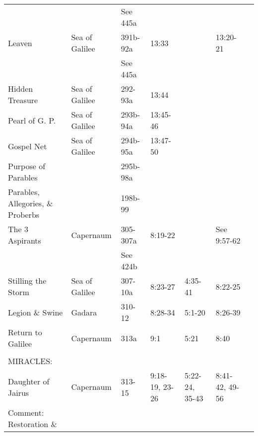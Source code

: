 \begin{longtable}[h]{lllllll}
                                   &                     & See 445a   &                 &                 &                      & \\
\quad Leaven                       & Sea of Galilee      & 391b-92a   & 13:33           &                 & 13:20-21             & \\
                                   &                     & See 445a   &                 &                 &                      & \\
\quad Hidden Treasure              & Sea of Galilee      & 292-93a    & 13:44           &                 &                      & \\
\quad Pearl of G. P.               & Sea of Galilee      & 293b-94a   & 13:45-46        &                 &                      & \\
\quad Gospel Net                   & Sea of Galilee      & 294b-95a   & 13:47-50        &                 &                      & \\
Purpose of Parables                &                     & 295b-98a   &                 &                 &                      & \\
Parables, Allegories, \& Proberbs  &                     & 198b-99    &                 &                 &                      & \\
The 3 Aspirants                    & Capernaum           & 305-307a   & 8:19-22         &                 & See 9:57-62          & \\
                                   &                     & See 424b   &                 &                 &                      & \\
Stilling the Storm                 & Sea of Galilee      & 307-10a    & 8:23-27         & 4:35-41         & 8:22-25              & \\
Legion \& Swine                    & Gadara              & 310-12     & 8:28-34         & 5:1-20          & 8:26-39              & \\
Return to Galilee                  & Capernaum           & 313a       & 9:1             & 5:21            & 8:40                 & \\
\\
\multicolumn{7}{l}{MIRACLES:} \\
\quad Daughter of Jairus           & Capernaum           & 313-15     & 9:18-19, 23-26  & 5:22-24, 35-43  & 8:41-42, 49-56       & \\
Comment: Restoration \& \\

\end{longtable}
